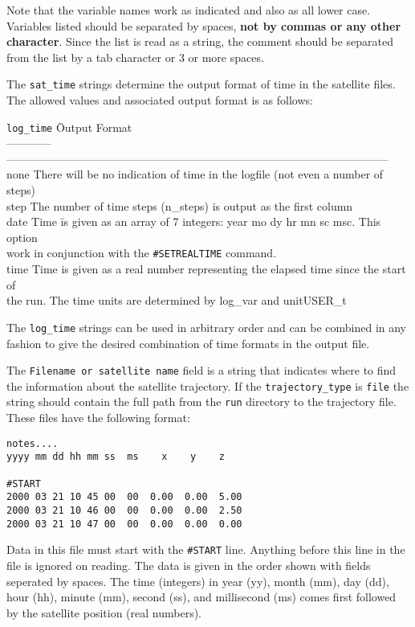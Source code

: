 Note that the variable names work as indicated and also as all lower case.
Variables listed should be separated by spaces, {\bf not by commas or any other
character}.  Since the list is read as a string, the comment should be separated
from the list by a tab character or 3 or more spaces.


The {\tt sat\_time} strings determine the output format of time in the satellite files.
The allowed values and associated output format is as follows:
\begin{tabbing}
{\tt log\_time}     \hspace{.5in} \=  Output Format \\
------------ \> ------------------------------------------------------------------------------------------------------ \\
none  \> There will be no indication of time in the logfile (not even a 
               number of steps) \\
step  \> The number of time steps (n\_steps) is output as the first column \\
date  \> Time \=is given as an array of 7 integers:  year mo dy hr mn sc msc.  This option \\
      \>      \>work in conjunction with the {\tt \#SETREALTIME} command. \\
time  \> Time is given as a real number representing the  elapsed time since the start of \\
      \>      \>  the run.  The time units are determined by log\_var and unitUSER\_t
\end{tabbing}
The  {\tt log\_time} strings can be used in arbitrary order and can be combined in
any fashion to give the desired combination of time formats in the output file.

The {\tt  Filename or satellite name} field is a string that indicates where to
find the information about the satellite trajectory.  If the {\tt trajectory\_type} is
{\tt file} the string should contain the full path from the {\tt run} directory to
the trajectory file.  These files have the following format:
\begin{verbatim}
notes....
yyyy mm dd hh mm ss  ms    x    y    z   
					 
#START					 
2000 03 21 10 45 00  00  0.00  0.00  5.00
2000 03 21 10 46 00  00  0.00  0.00  2.50
2000 03 21 10 47 00  00  0.00  0.00  0.00
\end{verbatim}
Data in this file must start with the {\tt \#START} line.  Anything before
this line in the file is ignored on reading.  The data is given in the order shown with
fields seperated by spaces.  The time (integers) in 
year (yy), month (mm), day (dd), hour (hh), minute (mm), second (ss), 
and millisecond (ms) comes first followed by the satellite position (real numbers).

